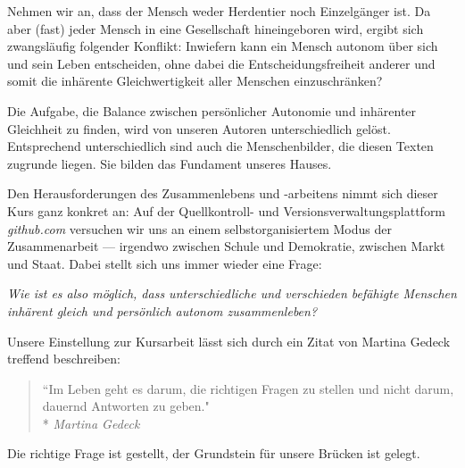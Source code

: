 Nehmen wir an, dass der Mensch weder Herdentier noch Einzelgänger ist.
Da aber (fast) jeder Mensch in eine Gesellschaft hineingeboren wird, ergibt sich zwangsläufig folgender Konflikt:
Inwiefern kann ein Mensch autonom über sich und sein Leben entscheiden, ohne dabei die Entscheidungsfreiheit anderer und somit die inhärente Gleichwertigkeit aller Menschen einzuschränken?

Die Aufgabe, die Balance zwischen persönlicher Autonomie und inhärenter Gleichheit zu finden, wird von unseren Autoren unterschiedlich gelöst.
Entsprechend unterschiedlich sind auch die Menschenbilder, die diesen Texten zugrunde liegen.
Sie bilden das Fundament unseres Hauses.

Den Herausforderungen des Zusammenlebens und -arbeitens nimmt sich dieser Kurs ganz konkret an:
Auf der Quellkontroll- und Versionsverwaltungsplattform \emph{github.com} versuchen wir uns an einem selbstorganisiertem Modus der Zusammenarbeit --- irgendwo zwischen Schule und Demokratie, zwischen Markt und Staat.
Dabei stellt sich uns immer wieder eine Frage:

\emph{Wie ist es also möglich, dass unterschiedliche und verschieden befähigte Menschen inhärent gleich und persönlich autonom zusammenleben?}

Unsere Einstellung zur Kursarbeit lässt sich durch ein Zitat von Martina Gedeck treffend beschreiben:

\begin{quote}
	``Im Leben geht es darum, die richtigen Fragen zu stellen und nicht darum, dauernd Antworten zu geben."\\*
	\emph{Martina Gedeck}
\end{quote}

Die richtige Frage ist gestellt, der Grundstein für unsere Brücken ist gelegt.